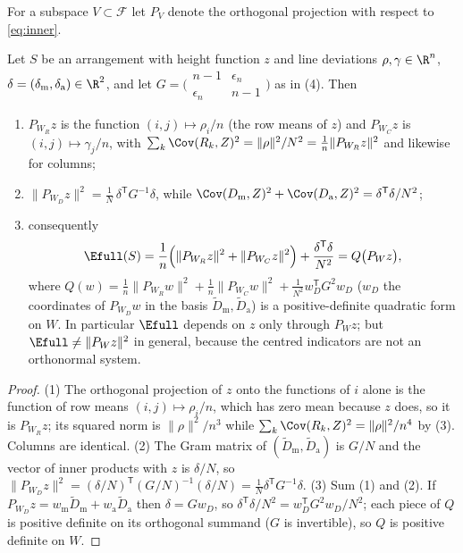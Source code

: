 For a subspace $V\subset\mathcal F$ let $P_V$ denote the orthogonal projection with respect to \eqref{eq:inner}.

\begin{lemma}
\label{lem:projection}
Let $S$ be an arrangement with height function $z$ and line deviations $\rho,\gamma\in\R^{n}$,
$\delta=(\delta_{\mathrm m},\delta_{\mathrm a})\in\R^{2}$, and let $G=\bigl(\begin{smallmatrix}n-1&\epsilon_n\\ \epsilon_n&n-1\end{smallmatrix}\bigr)$
as in (4).  Then
\begin{enumerate}
\item $P_{W_R}z$ is the function $(i,j)\mapsto\rho_i/n$ (the row means of $z$) and $P_{W_C}z$ is $(i,j)\mapsto\gamma_j/n$, with
$\sum_{k}\Cov(R_k,Z)^{2}=\|\rho\|^{2}/N^{2}=\frac1n\|P_{W_R}z\|^{2}$ and likewise for columns;
\item $\|P_{W_D}z\|^{2}=\frac1N\,\delta^{\mathsf T}G^{-1}\delta$, while $\Cov(D_{\mathrm m},Z)^{2}+\Cov(D_{\mathrm a},Z)^{2}=\delta^{\mathsf T}\delta/N^{2}$;
\item consequently
\begin{equation}
\Efull(S)=\frac1n\Bigl(\|P_{W_R}z\|^{2}+\|P_{W_C}z\|^{2}\Bigr)+\frac{\delta^{\mathsf T}\delta}{N^{2}}=Q\bigl(P_Wz\bigr),
\label{eq:Efull_projection}
\end{equation}
where $Q(w)=\frac1n\|P_{W_R}w\|^{2}+\frac1n\|P_{W_C}w\|^{2}+\frac1{N^{2}}w_D^{\mathsf T}G^{2}w_D$ ($w_D$ the coordinates of
$P_{W_D}w$ in the basis $\tilde D_{\mathrm m},\tilde D_{\mathrm a}$) is a positive-definite quadratic form on $W$.
In particular $\Efull$ depends on $z$ only through $P_Wz$; but $\Efull\ne\|P_Wz\|^{2}$ in general, because the centred
indicators are not an orthonormal system.
\end{enumerate}
\end{lemma}

\begin{proof}
(1) The orthogonal projection of $z$ onto the functions of $i$ alone is the function of row means $(i,j)\mapsto\rho_i/n$, which
has zero mean because $z$ does, so it is $P_{W_R}z$; its squared norm is $\|\rho\|^{2}/n^{3}$ while
$\sum_k\Cov(R_k,Z)^{2}=\|\rho\|^{2}/n^{4}$ by (3).  Columns are identical.
(2) The Gram matrix of $(\tilde D_{\mathrm m},\tilde D_{\mathrm a})$ is $G/N$ and the vector of inner products with $z$ is
$\delta/N$, so $\|P_{W_D}z\|^{2}=(\delta/N)^{\mathsf T}(G/N)^{-1}(\delta/N)=\frac1N\delta^{\mathsf T}G^{-1}\delta$.
(3) Sum (1) and (2).  If $P_{W_D}z=w_{\mathrm m}\tilde D_{\mathrm m}+w_{\mathrm a}\tilde D_{\mathrm a}$ then $\delta=Gw_D$,
so $\delta^{\mathsf T}\delta/N^{2}=w_D^{\mathsf T}G^{2}w_D/N^{2}$; each piece of $Q$ is positive definite on its orthogonal
summand ($G$ is invertible), so $Q$ is positive definite on $W$.
\end{proof}

